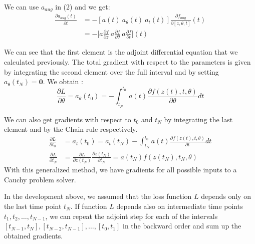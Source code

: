 \documentclass[10pt,a4paper]{article}
\theoremstyle{definition}
\theoremstyle{definition}
\begin{document}
We can use $a_{aug}$ in (2) and we get:
\begin{align*}
\frac{\partial a_{aug}(t)}{\partial t} 
&= - [a(t) \ a_\theta (t) \ a_t (t)]\frac{\partial f_{aug}}{\partial [ z,\theta , t]}(t) \\
&= -\Big[a\frac{\partial f}{\partial z} \ a\frac{\partial f}{\partial \theta} \ a\frac{\partial  f}{\partial t}\Big] (t)
\end{align*}

We can see that the first element is the adjoint differential equation that we calculated previously. The total gradient with respect to the parameters is given by integrating the second element over the full interval and by setting $a_\theta (t_N) = \textbf{0}$. We obtain :
$$
\frac{\partial L}{\partial \theta} = a_\theta (t_0) = - \int_{t_N}^{t_0} a(t) \frac{\partial f(z(t),t,\theta)}{\partial \theta} dt
$$

We can also get gradients with respect to $t_0$ and $t_N$ by integrating the last element and by the Chain rule respectively.
\begin{align*}
\frac{\partial L}{\partial t_0} &= a_t(t_0) = a_t(t_N) - \int_{t_N}^{t_0} a(t) \frac{\partial f(z(t),t,\theta)}{\partial t} dt \\
\frac{\partial L}{\partial t_N} &= \frac{\partial L}{\partial z(t_N)} \frac{\partial z(t_N)}{\partial t_N} = a(t_N)f(z(t_N),t_N,\theta)
\end{align*}
With this generalized method, we have gradients for all possible inputs to a Cauchy problem solver.



In the development above, we assumed that the loss function $L$ depends only on the last time point $t_N$. If function $L$ depends also on intermediate time points $t_1, t_2, \dots , t_{N-1}$, we can repeat the adjoint step for each of the intervals $[t_{N-1}, t_N ],[t_{N-2}, t_{N-1}], \dots , [t_0,t_1]$ in the backward order and sum up the obtained gradients.
\end{document}
